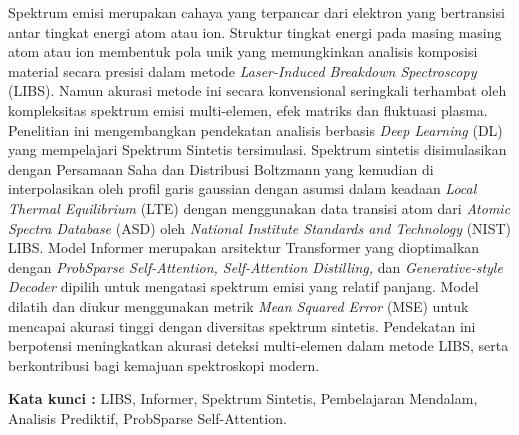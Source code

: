 \begin{abstractind}

Spektrum emisi merupakan cahaya yang terpancar dari elektron yang bertransisi antar tingkat energi atom atau ion. Struktur tingkat energi pada masing masing atom atau ion membentuk pola unik yang memungkinkan analisis komposisi material secara presisi dalam metode \textit{Laser-Induced Breakdown Spectroscopy} (LIBS). Namun akurasi metode ini secara konvensional seringkali terhambat oleh kompleksitas spektrum emisi multi-elemen, efek matriks dan fluktuasi plasma. Penelitian ini mengembangkan pendekatan analisis berbasis \textit{Deep Learning} (DL) yang mempelajari Spektrum Sintetis tersimulasi. Spektrum sintetis disimulasikan dengan Persamaan Saha dan Distribusi Boltzmann yang kemudian di interpolasikan oleh profil garis gaussian dengan asumsi dalam keadaan \textit{Local Thermal Equilibrium} (LTE) dengan menggunakan data transisi atom dari \textit{Atomic Spectra Database} (ASD) oleh \textit{National Institute Standards and Technology} (NIST) LIBS. Model Informer merupakan arsitektur Transformer yang dioptimalkan dengan \textit{ProbSparse Self-Attention, Self-Attention Distilling,} dan \textit{Generative-style Decoder} dipilih untuk mengatasi spektrum emisi yang relatif panjang. Model dilatih dan diukur menggunakan metrik \textit{Mean Squared Error} (MSE)  untuk mencapai akurasi tinggi dengan diversitas spektrum sintetis. Pendekatan ini berpotensi meningkatkan akurasi deteksi multi-elemen dalam metode LIBS, serta berkontribusi bagi kemajuan spektroskopi modern.

\bigskip
\noindent
\textbf{Kata kunci :} LIBS, Informer, Spektrum Sintetis, Pembelajaran Mendalam, Analisis Prediktif, ProbSparse Self-Attention.
\end{abstractind}

